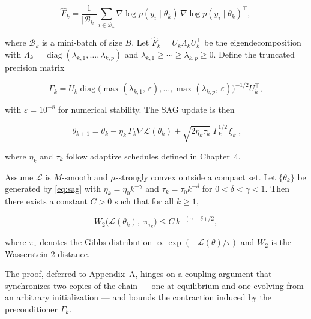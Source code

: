 \documentclass[12pt,letterpaper,twoside]{report}
\begin{document}
\begin{equation}\label{eq:fisher}
\hat{F}_{k} = \frac{1}{|\mathcal{B}_{k}|}\sum_{i \in \mathcal{B}_{k}} \nabla\log p(y_{i}\mid\theta_{k})\,\nabla\log p(y_{i}\mid\theta_{k})^{\top},
\end{equation}

\noindent where $\mathcal{B}_{k}$ is a mini-batch of size $B$. Let $\hat{F}_{k} = U_{k}\Lambda_{k}U_{k}^{\top}$ be the eigendecomposition with $\Lambda_{k} = \operatorname{diag}(\lambda_{k,1}, \ldots, \lambda_{k,p})$ and $\lambda_{k,1} \ge \cdots \ge \lambda_{k,p} \ge 0$. Define the truncated precision matrix

\begin{equation}\label{eq:precision}
\Gamma_{k} = U_{k}\operatorname{diag}\bigl(\max(\lambda_{k,1},\,\varepsilon), \ldots, \max(\lambda_{k,p},\,\varepsilon)\bigr)^{-1/2} U_{k}^{\top},
\end{equation}

\noindent with $\varepsilon = 10^{-8}$ for numerical stability. The SAG update is then

\begin{equation}\label{eq:sag}
\boxed{\;\theta_{k+1} = \theta_{k} - \eta_{k}\,\Gamma_{k}\nabla\mathcal{L}(\theta_{k}) + \sqrt{2\eta_{k}\tau_{k}}\;\Gamma_{k}^{1/2}\,\xi_{k}\;},
\end{equation}

\noindent where $\eta_{k}$ and $\tau_{k}$ follow adaptive schedules defined in Chapter~4.

\begin{theorembox}[title={Convergence in $W_{2}$ Distance}]
Assume $\mathcal{L}$ is $M$-smooth and $\mu$-strongly convex outside a compact set. Let $\{\theta_{k}\}$ be generated by \eqref{eq:sag} with $\eta_{k} = \eta_{0}k^{-\gamma}$ and $\tau_{k} = \tau_{0}k^{-\delta}$ for $0 < \delta < \gamma < 1$. Then there exists a constant $C > 0$ such that for all $k \ge 1$,

\begin{equation}\label{eq:convergence}
W_{2}\bigl(\mathcal{L}(\theta_{k}),\; \pi_{\tau_{k}}\bigr) \le C\,k^{-(\gamma-\delta)/2},
\end{equation}

\noindent where $\pi_{\tau}$ denotes the Gibbs distribution $\propto \exp(-\mathcal{L}(\theta)/\tau)$ and $W_{2}$ is the Wasserstein-2 distance.
\end{theorembox}

The proof, deferred to Appendix~A, hinges on a coupling argument that synchronizes two copies of the chain --- one at equilibrium and one evolving from an arbitrary initialization --- and bounds the contraction induced by the preconditioner $\Gamma_{k}$.
\end{document}
